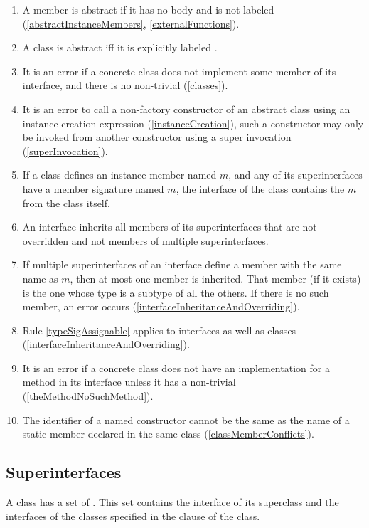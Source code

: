 \documentclass[makeidx]{article}
\begin{document}
{\begin{enumerate}
\item A member is abstract if
  it has no body and is not labeled \EXTERNAL{}
  (\ref{abstractInstanceMembers}, \ref{externalFunctions}).
\item A class is abstract if{}f it is explicitly labeled \ABSTRACT{}.
\item It is an error if a concrete class does not implement some member
  of its interface, and there is no non-trivial 
  (\ref{classes}).
\item It is an error to call a non-factory constructor of an abstract class
  using an instance creation expression (\ref{instanceCreation}),
  such a constructor may only be invoked from another constructor
  using a super invocation (\ref{superInvocation}).
\item If a class defines an instance member named $m$,
  and any of its superinterfaces have a member signature named $m$,
  the interface of the class contains the $m$ from the class itself.
\item An interface inherits all members of its superinterfaces
  that are not overridden and not members of multiple superinterfaces.
\item If multiple superinterfaces of an interface
  define a member with the same name as $m$,
  then at most one member is inherited.
  That member (if it exists) is the one whose type is a subtype
  of all the others.
  If there is no such member, an error occurs
  (\ref{interfaceInheritanceAndOverriding}).
\item Rule \ref{typeSigAssignable} applies to interfaces as well as classes
  (\ref{interfaceInheritanceAndOverriding}).
\item It is an error if a concrete class does not have an implementation
  for a method in its interface
  unless it has a non-trivial 
  (\ref{theMethodNoSuchMethod}).
\item The identifier of a named constructor cannot be
  the same as the name of a static member declared in the same class
  (\ref{classMemberConflicts}).
\end{enumerate}
}


\subsection{Superinterfaces}

\LMHash{}%
A class has a set of .
This set contains the interface of its superclass
and the interfaces of the classes specified in
the \IMPLEMENTS{} clause of the class.
\end{document}
